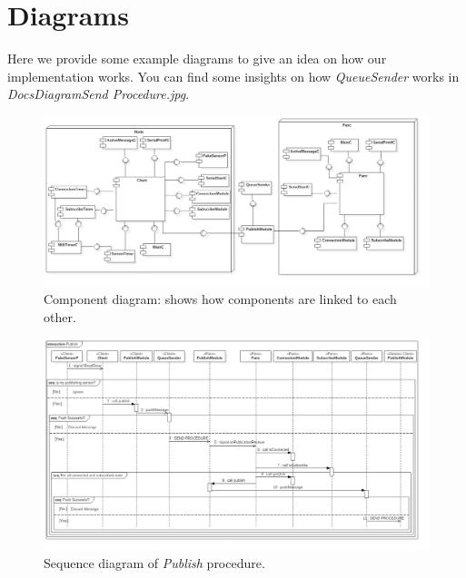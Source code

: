 \documentclass[10pt]{article}
\begin{document}
\section{Diagrams}
Here we provide some example diagrams to give an idea on how our implementation works. You can find some insights on how \emph{QueueSender} works in \emph{Docs\/Diagram\/Send Procedure.jpg}.
\begin{figure}[h]
\caption{Component diagram: shows how components are linked to each other.}
\centering
\includegraphics[scale=0.35]{ComponentDiagram}
\end{figure}
\begin{figure}[h]
\caption{Sequence diagram of \emph{Publish} procedure.}
\centering
\includegraphics[scale=0.35]{Publish}
\end{figure}
\end{document}
